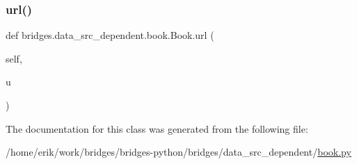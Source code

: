 \mbox{\label{classbridges_1_1data__src__dependent_1_1book_1_1_book_a193b108cb73c94087a907e61481618e2}} 
\subsubsection{\texorpdfstring{url()}{url()}\hspace{0.1cm}{\footnotesize\ttfamily [2/2]}}
{\footnotesize\ttfamily def bridges.\+data\+\_\+src\+\_\+dependent.\+book.\+Book.\+url (\begin{DoxyParamCaption}\item[{}]{self,  }\item[{}]{u }\end{DoxyParamCaption})}



The documentation for this class was generated from the following file\+:\begin{DoxyCompactItemize}
\item 
/home/erik/work/bridges/bridges-\/python/bridges/data\+\_\+src\+\_\+dependent/\hyperlink{book_8py}{book.\+py}\end{DoxyCompactItemize}

